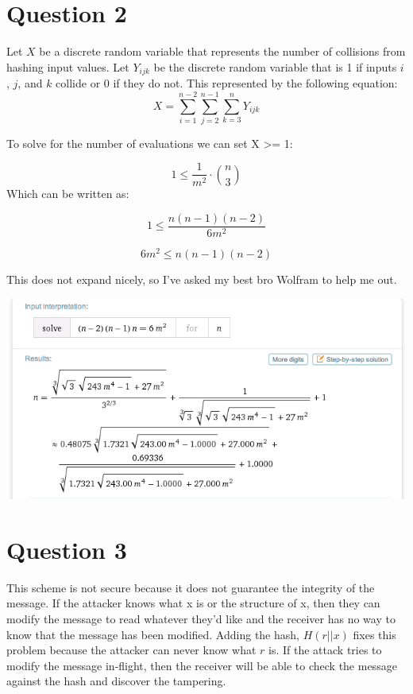 \documentclass[a4paper]{article}
\begin{document}
\section{Question 2}
Let $X$ be a discrete random variable that represents the number of collisions from hashing input values. Let $Y_{ijk}$ be the discrete random variable that is 1 if inputs $i$, $j$, and $k$ collide or 0 if they do not. This represented by the following equation:
$$
X = \sum\limits_{i=1}^{n-2} \sum\limits_{j=2}^{n-1} \sum\limits_{k=3}^{n} Y_{ijk}
$$

To solve for the number of evaluations we can set X >= 1:

$$
1 \leq  \frac{1}{m^2}\cdot {n \choose{3}}
$$
Which can be written as:

$$
1 \leq \frac{n(n-1)(n-2)}{6m^2}
$$

$$
6m^2 \leq n(n-1)(n-2)
$$

This does not expand nicely, so I've asked my best bro Wolfram to help me out.

\includegraphics[width=1\textwidth]{a7q2.png}



\section{Question 3}
This scheme is not secure because it does not guarantee the integrity of the message.
If the attacker knows what x is or the structure of x, then they can modify the message to read whatever
they'd like and the receiver has no way to know that the message has been modified.
Adding the hash, $H(r||x)$ fixes this problem because the attacker can never know what $r$ is.
If the attack tries to modify the message in-flight, then the receiver will be able to check the message against the hash and discover the tampering.
\end{document}
